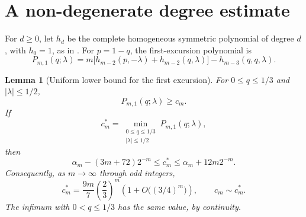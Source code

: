 \documentclass[11pt]{article}
\newtheorem{lemma}{Lemma}[section]
\theoremstyle{remark}
\begin{document}
\section{A non-degenerate degree estimate}

For $d\geq0$, let $h_d$ be the complete homogeneous symmetric polynomial
of degree $d$, with $h_0=1$, as in \cite[Eq.~(3.1)]{dense}.
For $p=1-q$, the first-excursion polynomial is
\begin{equation}\label{eq:first-poly}
 P_{m,1}(q;\lambda)
 =m\bigl[h_{m-2}(p,-\lambda)+h_{m-2}(q,\lambda)\bigr]
   -h_{m-3}(q,q,\lambda).
\end{equation}

\begin{lemma}[Uniform lower bound for the first excursion]
\label{lem:first-poly}
For $0\leq q\leq1/3$ and $|\lambda|\leq1/2$,
\begin{equation}\label{eq:poly-lower}
 P_{m,1}(q;\lambda)\geq c_m.
\end{equation}
If
\[
 c_m^*=\min_{\substack{0\leq q\leq1/3\\|\lambda|\leq1/2}}
             P_{m,1}(q;\lambda),
\]
then
\begin{equation}\label{eq:c-star-bounds}
 \alpha_m-(3m+72)2^{-m}
 \leq c_m^*\leq\alpha_m+12m2^{-m}.
\end{equation}
Consequently, as $m\to\infty$ through odd integers,
\begin{equation}\label{eq:c-asymptotic}
 c_m^*=\frac{9m}{7}\left(\frac23\right)^m
       \left(1+O\bigl((3/4)^m\bigr)\right),
 \qquad c_m\sim c_m^*.
\end{equation}
The infimum with $0<q\leq1/3$ has the same value, by continuity.
\end{lemma}
\end{document}
